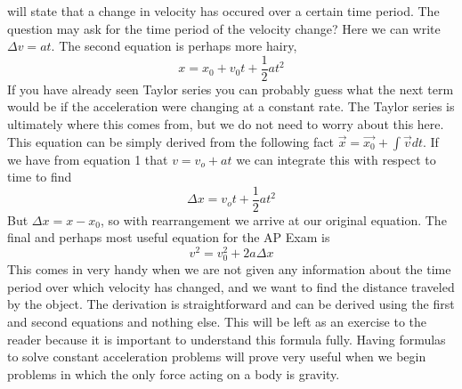 \documentclass{article}[gray]
\numberwithin{equation}{subsection}
\begin{document}
will state that a change in velocity has occured over a certain time period. The question may ask for the time period of the velocity change? Here we can write $\Delta v= at$. The second equation is perhaps more hairy, \begin{equation}x = x_0 + v_0 t+\frac{1}{2}at^2\end{equation} If you have already seen Taylor series you can probably guess what the next term would be if the acceleration were changing at a constant rate. The Taylor series is ultimately where this comes from, but we do not need to worry about this here. This equation can be simply derived from the following fact $\vec{x}= \vec{x_0} + \int \vec{v} dt$.  If we have from equation 1 that $v = v_o+at$ we can integrate this with respect to time to find \begin{equation}\Delta x = v_ot+\frac{1}{2}at^2\end{equation} But $\Delta x = x-x_0$, so with rearrangement we arrive at our original equation. The final and perhaps most useful equation for the AP Exam is \begin{equation} v^2=v_0^2+2a \Delta x\end{equation} This comes in very handy when we are not given any information about the time period over which velocity has changed, and we want to find the distance traveled by the object. The derivation is straightforward and can be derived using the first and second equations and nothing else. This will be left as an exercise to the reader because it is important to understand this formula fully. Having formulas to solve constant acceleration problems will prove very useful when we begin problems in which the only force acting on a body is gravity. 
\newline
\newline
{}
\newline
\end{document}
